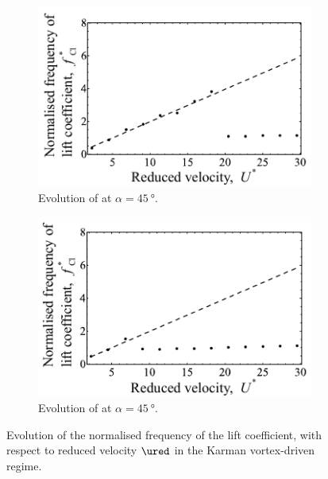 \documentclass[a4paper,fleqn]{cas-sc}
\begin{document}
\begin{figure}
  \centering
  \begin{subfigure}[h]{0.38\textwidth}
    \includegraphics[width=\textwidth]{figs/clFreq2}
    \caption{Evolution of at $\alpha = \SI{45}{\degree}$.}
    \label{fig:clFreq2}
  \end{subfigure}

  \begin{subfigure}[h]{0.38\textwidth}
    \includegraphics[width=\textwidth]{figs/clFreq1}
    \caption{Evolution of at $\alpha = \SI{45}{\degree}$.}
    \label{fig:clFreq1}
  \end{subfigure}

  \caption{Evolution of the normalised frequency of the lift coefficient,  with respect to reduced velocity $\ured$ in the Karman vortex-driven regime.} \label{fig:clFreqKarman}
\end{figure}
\end{document}
